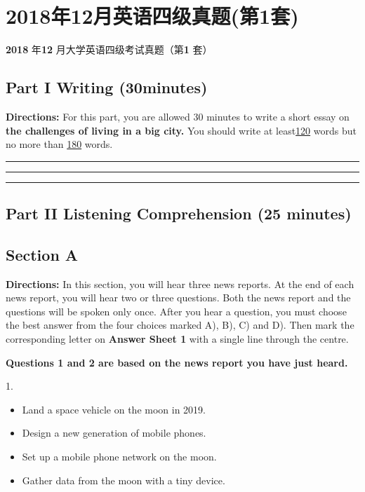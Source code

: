 \documentclass[UTF8,11pt]{ctexart}
\begin{document}
\section*{2018年12月英语四级真题(第1套)}
\textbf{2018} 年\textbf{12} 月大学英语四级考试真题（第\textbf{1} 套）


\subsection*{\textbf{Part I} \textbf{Writing} \textbf{(30minutes)}}


\textbf{Directions:} For this part, you are allowed 30 minutes to write a short essay on\textbf{ the challenges of living in a big city.} You should write at least\uline{120} words but no more than \uline{180} words. \par\noindent\rule{.95\linewidth}{.4pt}\par  \par\noindent\rule{.95\linewidth}{.4pt}\par  \par\noindent\rule{.95\linewidth}{.4pt}\par


\subsection*{\textbf{Part II} \textbf{Listening Comprehension} \textbf{(25 minutes)}}


\subsection*{\textbf{Section A}}


\textbf{Directions:} In this section, you will hear three news reports. At the end of each news report, you will hear two or three questions. Both the news report and the questions will be spoken only once. After you hear a question, you must choose the best answer from the four choices marked A), B), C) and D). Then mark the corresponding letter on\textbf{ Answer Sheet 1} with a single line through the centre.


\textbf{Questions 1 and 2 are based on the news report you have just heard.}


1.


\begin{itemize}[leftmargin=2em,itemsep=.2em,topsep=.4em]\item[A.] Land a space vehicle on the moon in 2019.
\item[B.] Design a new generation of mobile phones.
\item[C.] Set up a mobile phone network on the moon.
\item[D.] Gather data from the moon with a tiny device.
\end{itemize}
\end{document}
